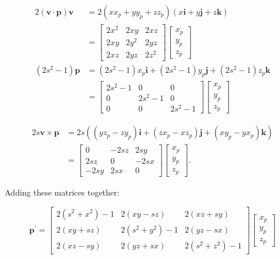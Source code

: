 $$
\begin{aligned}
2(\mathbf{v} \cdot \mathbf{p}) \mathbf{v} & =2\left(x x_{p}+y y_{p}+z z_{p}\right)(x \mathbf{i}+y \mathbf{j}+z \mathbf{k}) \\
& =\left[\begin{array}{lll}
2 x^{2} & 2 x y & 2 x z \\
2 x y & 2 y^{2} & 2 y z \\
2 x z & 2 y z & 2 z^{2}
\end{array}\right]\left[\begin{array}{l}
x_{p} \\
y_{p} \\
z_{p}
\end{array}\right] \\
\left(2 s^{2}-1\right) \mathbf{p} & =\left(2 s^{2}-1\right) x_{p} \mathbf{i}+\left(2 s^{2}-1\right) y_{p} \mathbf{j}+\left(2 s^{2}-1\right) z_{p} \mathbf{k} \\
& =\left[\begin{array}{ccc}
2 s^{2}-1 & 0 & 0 \\
0 & 2 s^{2}-1 & 0 \\
0 & 0 & 2 s^{2}-1
\end{array}\right]\left[\begin{array}{l}
x_{p} \\
y_{p} \\
z_{p}
\end{array}\right]
\end{aligned}
$$

$$
\begin{aligned}
2 s \mathbf{v} \times \mathbf{p} & =2 s\left(\left(y z_{p}-z y_{p}\right) \mathbf{i}+\left(z x_{p}-x z_{p}\right) \mathbf{j}+\left(x y_{p}-y x_{p}\right) \mathbf{k}\right) \\
& =\left[\begin{array}{ccc}
0 & -2 s z & 2 s y \\
2 s z & 0 & -2 s x \\
-2 s y & 2 s x & 0
\end{array}\right]\left[\begin{array}{l}
x_{p} \\
y_{p} \\
z_{p}
\end{array}\right] .
\end{aligned}
$$

Adding these matrices together:

$$
\mathbf{p}^{\prime}=\left[\begin{array}{ccc}
2\left(s^{2}+x^{2}\right)-1 & 2(x y-s z) & 2(x z+s y) \\
2(x y+s z) & 2\left(s^{2}+y^{2}\right)-1 & 2(y z-s x) \\
2(x z-s y) & 2(y z+s x) & 2\left(s^{2}+z^{2}\right)-1
\end{array}\right]\left[\begin{array}{l}
x_{p} \\
y_{p} \\
z_{p}
\end{array}\right]
$$

